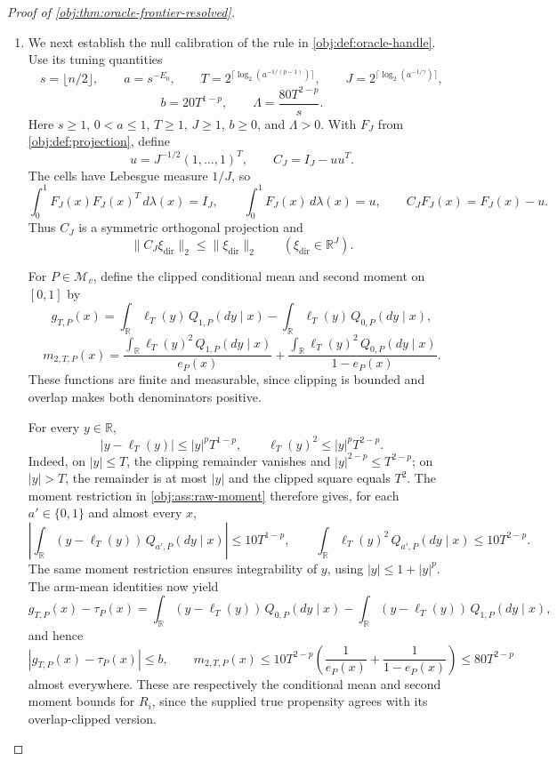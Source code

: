 \begin{proof}[Proof of \cref{obj:thm:oracle-frontier-resolved}]
\begin{enumerate}
\item We next establish the null calibration of the rule in \cref{obj:def:oracle-handle}. Use its tuning quantities
\[
s=\lfloor n/2\rfloor,\qquad a=s^{-E_0},\qquad
T=2^{\lceil\log_2(a^{-1/(p-1)})\rceil},\qquad
J=2^{\lceil\log_2(a^{-1/\gamma})\rceil},
\]
\[
b=20T^{1-p},\qquad
\Lambda=\frac{80T^{2-p}}s.
\]
Here \(s\ge1\), \(0<a\le1\), \(T\ge1\), \(J\ge1\), \(b\ge0\), and \(\Lambda>0\).
With \(F_J\) from \cref{obj:def:projection}, define
\[
u=J^{-1/2}(1,\ldots,1)^T,\qquad
C_J=I_J-uu^T.
\]
The cells have Lebesgue measure \(1/J\), so
\[
\int_0^1F_J(x)F_J(x)^T\,d\lambda(x)=I_J,
\qquad
\int_0^1F_J(x)\,d\lambda(x)=u,
\qquad
C_JF_J(x)=F_J(x)-u.
\]
Thus \(C_J\) is a symmetric orthogonal projection and
\[
\|C_J\xi_{\mathrm{dir}}\|_2\le\|\xi_{\mathrm{dir}}\|_2
\qquad(\xi_{\mathrm{dir}}\in\mathbb R^J).
\]

For \(P\in\mathcal M_v\), define the clipped conditional mean and second moment on \([0,1]\) by
\[
g_{T,P}(x)
=\int_{\mathbb R}\ell_T(y)\,Q_{1,P}(dy\mid x)
-\int_{\mathbb R}\ell_T(y)\,Q_{0,P}(dy\mid x),
\]
\[
m_{2,T,P}(x)
=\frac{\int_{\mathbb R}\ell_T(y)^2\,Q_{1,P}(dy\mid x)}{e_P(x)}
+\frac{\int_{\mathbb R}\ell_T(y)^2\,Q_{0,P}(dy\mid x)}{1-e_P(x)}.
\]
These functions are finite and measurable, since clipping is bounded and overlap makes both denominators positive.

For every \(y\in\mathbb R\),
\[
|y-\ell_T(y)|\le |y|^pT^{1-p},
\qquad
\ell_T(y)^2\le |y|^pT^{2-p}.
\]
Indeed, on \(|y|\le T\), the clipping remainder vanishes and
\(|y|^{2-p}\le T^{2-p}\); on \(|y|>T\), the remainder is at most \(|y|\) and the clipped square equals \(T^2\). The moment restriction in \cref{obj:ass:raw-moment} therefore gives, for each \(a'\in\{0,1\}\) and almost every \(x\),
\[
\left|\int_{\mathbb R}(y-\ell_T(y))\,Q_{a',P}(dy\mid x)\right|
\le10T^{1-p},
\qquad
\int_{\mathbb R}\ell_T(y)^2\,Q_{a',P}(dy\mid x)
\le10T^{2-p}.
\]
The same moment restriction ensures integrability of \(y\), using
\(|y|\le1+|y|^p\).
The arm-mean identities now yield
\[
g_{T,P}(x)-\tau_P(x)
=
\int_{\mathbb R}(y-\ell_T(y))\,Q_{0,P}(dy\mid x)
-\int_{\mathbb R}(y-\ell_T(y))\,Q_{1,P}(dy\mid x),
\]
and hence
\[
|g_{T,P}(x)-\tau_P(x)|\le b,
\qquad
m_{2,T,P}(x)
\le10T^{2-p}
\left(\frac1{e_P(x)}+\frac1{1-e_P(x)}\right)
\le80T^{2-p}
\]
almost everywhere. These are respectively the conditional mean and second moment bounds for \(R_i\), since the supplied true propensity agrees with its overlap-clipped version.


\end{enumerate}
\end{proof}
